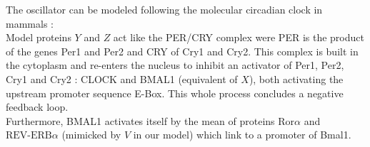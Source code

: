 The oscillator can be modeled following the molecular circadian clock in mammals : \\
Model proteins $Y$ and $Z$ act like the PER/CRY complex were PER is the product of the genes Per1 and Per2 and CRY of Cry1 and Cry2. This complex is built in the cytoplasm and re-enters the nucleus to inhibit an activator of Per1, Per2, Cry1 and Cry2 : CLOCK and BMAL1 (equivalent of $X$), both activating the upstream promoter sequence E-Box. This whole process concludes a negative feedback loop. \\
Furthermore, BMAL1 activates itself by the mean of proteins $\text{Ror}\alpha$ and $\text{REV-ERB}\alpha$ (mimicked by $V$ in our model) which link to a promoter of Bmal1.\\ 


